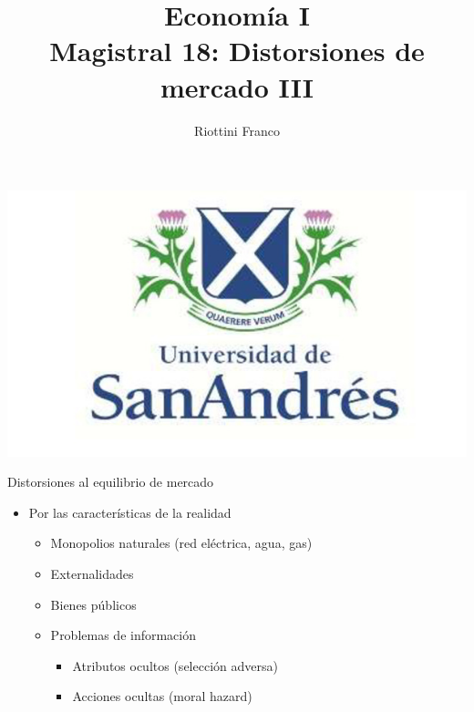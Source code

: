 \documentclass{beamer}
\title[Economía I]{Economía I \vspace{4mm}
\\ Magistral 18: Distorsiones de mercado III}
\date{}
\author[Riottini]{Riottini Franco}
\institute[]{Universidad de San Andrés}
\begin{document}
\begin{frame}
\titlepage
\centering
\includegraphics[scale=0.2]{../Figures/logoUDESA.jpg} 
\end{frame}

\begin{frame}{Distorsiones al equilibrio de mercado}
    \begin{itemize}
        \item Por las características de la realidad \vspace{1mm}
        \begin{itemize}
            \item Monopolios naturales (red eléctrica, agua, gas)   
             \vspace{1mm}
            \item Externalidades
             \vspace{1mm}
            \item Bienes públicos
            \vspace{1mm}
            \item Problemas de información
            \begin{itemize}
                \item Atributos ocultos (selección adversa)
                 \vspace{1mm}
                \item Acciones ocultas (moral hazard)
            \end{itemize}        
        \end{itemize}
    \end{itemize}
\end{frame}
\end{document}
